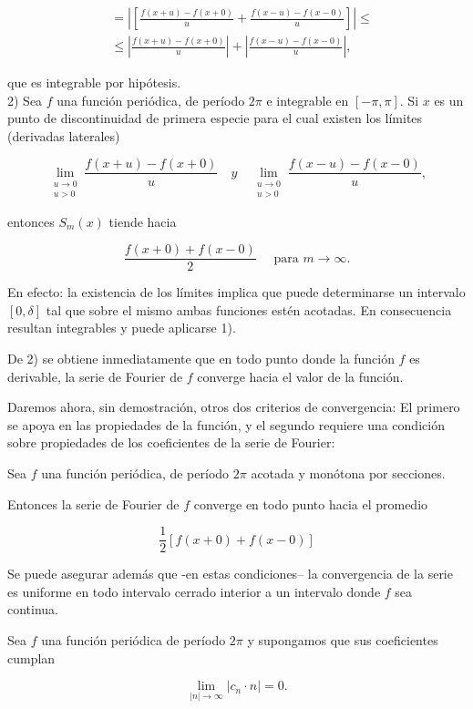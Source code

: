 \documentclass[10pt]{article}
\theoremstyle{plain}
\theoremstyle{definition}
\theoremstyle{remark}
\begin{document}
$$
\begin{aligned}
& =\left|\left[\frac{f(x+u)-f(x+0)}{u}+\frac{f(x-u)-f(x-0)}{u}\right]\right| \leqslant \\
& \leqslant\left|\frac{f(x+u)-f(x+0)}{u}\right|+\left|\frac{f(x-u)-f(x-0)}{u}\right|,
\end{aligned}
$$

que es integrable por hipótesis.\\
2) Sea $f$ una función periódica, de período $2 \pi$ e integrable en $[-\pi, \pi]$. Si $x$ es un punto de discontinuidad de primera especie para el cual existen los límites (derivadas laterales)

$$
\lim _{\substack{u \rightarrow 0 \\ u>0}} \frac{f(x+u)-f(x+0)}{u} \quad y \quad \lim _{\substack{u \rightarrow 0 \\ u>0}} \frac{f(x-u)-f(x-0)}{u},
$$

entonces $S_{m}(x)$ tiende hacia

$$
\frac{f(x+0)+f(x-0)}{2} \quad \text { para } m \rightarrow \infty .
$$

En efecto: la existencia de los límites implica que puede determinarse un intervalo $[0, \delta]$ tal que sobre el mismo ambas funciones estén acotadas. En consecuencia resultan integrables y puede aplicarse 1).

De 2) se obtiene inmediatamente que en todo punto donde la función $f$ es derivable, la serie de Fourier de $f$ converge hacia el valor de la función.

Daremos ahora, sin demostración, otros dos criterios de convergencia: El primero se apoya en las propiedades de la función, y el segundo requiere una condición sobre propiedades de los coeficientes de la serie de Fourier:

Sea $f$ una función periódica, de período $2 \pi$ acotada y monótona por secciones.

Entonces la serie de Fourier de $f$ converge en todo punto hacia el promedio


$$
\frac{1}{2}[f(x+0)+f(x-0)]
$$

Se puede asegurar además que -en estas condiciones-- la convergencia de la serie es uniforme en todo intervalo cerrado interior a un intervalo donde $f$ sea continua.

Sea $f$ una función periódica de período $2 \pi$ y supongamos que sus coeficientes cumplan

$$
\lim _{|n| \rightarrow \infty}\left|c_{n} \cdot n\right|=0 .
$$
\end{document}
